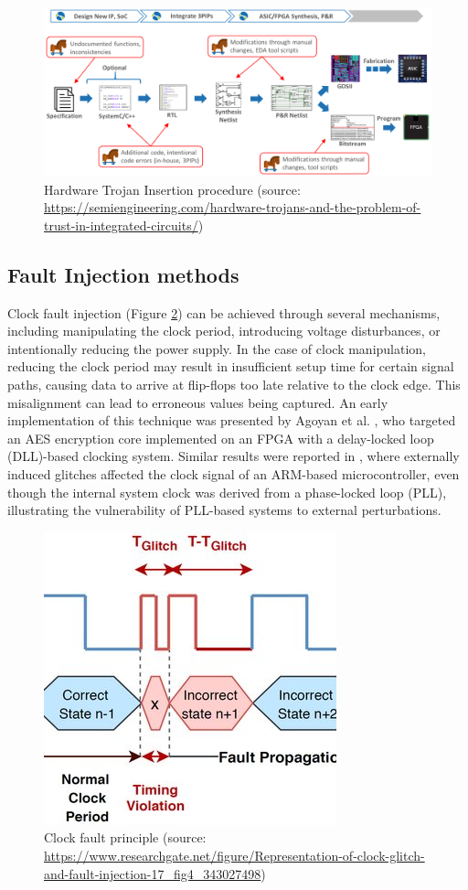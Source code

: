 \begin{figure}[t!]
  \centering
  \includegraphics[width=0.5\linewidth]{Chapitre1/figures/hardware trojan.png}
  \caption{Hardware Trojan Insertion procedure (source: \url{https://semiengineering.com/hardware-trojans-and-the-problem-of-trust-in-integrated-circuits/})}
  \label{hardware trojan}
\end{figure}

\subsection{Fault Injection methods}

Clock fault injection (Figure \ref{clock fault}) can be achieved through several mechanisms, including manipulating the clock period, introducing voltage disturbances, or intentionally reducing the power supply. In the case of clock manipulation, reducing the clock period may result in insufficient setup time for certain signal paths, causing data to arrive at flip-flops too late relative to the clock edge. This misalignment can lead to erroneous values being captured. An early implementation of this technique was presented by Agoyan et al. \cite{agoyan2010clocks}, who targeted an AES encryption core implemented on an FPGA with a delay-locked loop (DLL)-based clocking system. Similar results were reported in \cite{selmke2019peak}, where externally induced glitches affected the clock signal of an ARM-based microcontroller, even though the internal system clock was derived from a phase-locked loop (PLL), illustrating the vulnerability of PLL-based systems to external perturbations.

\begin{figure}[t!]
  \centering
  \includegraphics[width=0.5\linewidth]{Chapitre1/figures/clock fault.jpg}
  \caption{Clock fault principle (source: \url{https://www.researchgate.net/figure/Representation-of-clock-glitch-and-fault-injection-17_fig4_343027498})}
  \label{clock fault}
\end{figure}

